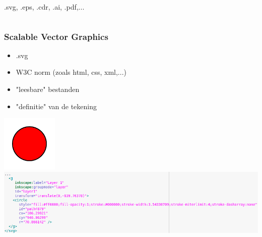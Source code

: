 \documentclass[t]{beamer}
\begin{document}
\begin{frame}
\begin{columns}
\begin{column}[T]{0.5\textwidth}
				\vspace{0.5cm}
				.svg, .eps, .cdr, .ai, .pdf,...
			\end{column}
		\end{columns}
	\end{frame}
	\begin{frame}
		\frametitle{Scalable Vector Graphics}
		\begin{itemize}
			\item .svg
			\item W3C norm (zoals html, css, xml,...)
			\item "leesbare" bestanden
			\item "definitie" van de tekening
		\end{itemize}
		\vspace{0.5cm}
		\begin{center}
			\hfill \includegraphics[width=0.2\textwidth]{fig/simpele_tekening}\\
			\vspace{-0.2cm}
			\includegraphics[width=\textwidth]{fig/simpele_tekening_bron.png}
		\end{center}	
	\end{frame}
\end{document}
